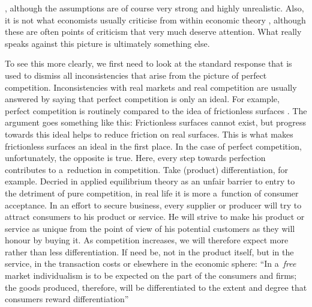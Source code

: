 \parencite[][]{friedman_methodology_1966}, %
 although the assumptions are of course very strong and highly unrealistic. Also, it is not what economists usually criticise from within economic theory 
\parencites[cf., e.g.,][]{ackerman_flawed_2004}[][]{petri_general_2003}, %
 although these are often points of criticism that very much deserve attention. What really speaks against this picture is ultimately something else.



To see this more clearly, we first need to look at the standard response that is used to dismiss all inconsistencies that arise from the picture of perfect competition. Inconsistencies with real markets and real competition are usually answered by saying that perfect competition is only an ideal. For example, perfect competition is routinely compared to the idea of frictionless surfaces 
\parencites[][]{samuelson_foundations_1947}[][]{friedman_methodology_1966}[][]{aumann_markets_1964}[][]{palgrave_macmillan_perfect_2008}. %
 The argument goes something like this: Frictionless surfaces cannot exist, but progress towards this ideal helps to reduce friction on real surfaces. This is what makes frictionless surfaces an ideal in the first place. In the case of perfect competition, unfortunately, the opposite is true. Here, every step towards perfection contributes to a~reduction in competition. Take (product) differentiation, for example. Decried in applied equilibrium theory as an unfair barrier to entry to the detriment of pure competition, in real life it is more a~function of consumer acceptance. In an effort to secure business, every supplier or producer will try to attract consumers to his product or service. He will strive to make his product or service as unique from the point of view of his potential customers as they will honour by buying it. As competition increases, we will therefore expect more rather than less differentiation. If need be, not in the product itself, but in the service, in the transaction costs or elsewhere in the economic sphere: ``In a~\textit{free} market individualism is to be expected on the part of the consumers and firms; the goods produced, therefore, will be differentiated to the extent and degree that consumers reward differentiation'' 
